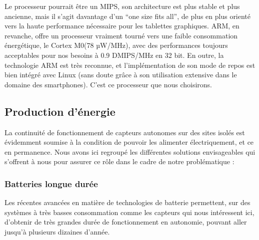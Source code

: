 Le processeur pourrait être un MIPS\footnotemark, son architecture est plus stable et plus ancienne, mais il s'agit davantage d'un ``one size fits all'', de plus en plus orienté vers la haute performance nécessaire pour les tablettes graphiques\footnotemark. ARM, en revanche, offre un processeur vraiment tourné vers une faible consommation énergétique, le Cortex M0\footnotemark (78 µW/MHz), avec des performances toujours acceptables pour nos besoins à 0.9 DMIPS/MHz en 32 bit. En outre, la technologie ARM est très reconnue, et l'implémentation de son mode de repos est bien intégré avec Linux (sans doute grâce à son utilisation extensive dans le domaine des smartphones). C'est ce processeur que nous choisirons.




\subsection{Production d'énergie}

La continuité de fonctionnement de capteurs autonomes sur des sites isolés est évidemment soumise à la condition de pouvoir les alimenter électriquement, et ce en permanence. Nous avons ici regroupé les différentes solutions envisageables qui s’offrent à nous pour assurer ce rôle dans le cadre de notre problématique :

\subsubsection{Batteries longue durée}

Les récentes avancées en matière de technologies de batterie permettent, sur des systèmes à très basses consommation comme les capteurs qui nous intéressent ici, d’obtenir de très grandes durée de fonctionnement en autonomie, pouvant aller jusqu’à plusieurs dizaines d’année\footnotemark.


